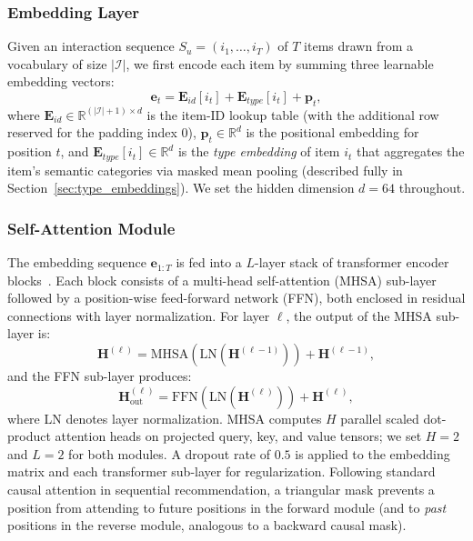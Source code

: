 \subsubsection{Embedding Layer}
Given an interaction sequence $S_u = (i_1, \dots, i_T)$ of $T$ items drawn from a vocabulary of size $|\mathcal{I}|$, we first encode each item by summing three learnable embedding vectors:
\begin{equation}
\mathbf{e}_t = \mathbf{E}_{id}[i_t] + \mathbf{E}_{type}[i_t] + \mathbf{p}_t,
\end{equation}
where $\mathbf{E}_{id} \in \mathbb{R}^{(|\mathcal{I}|+1) \times d}$ is the item-ID lookup table (with the additional row reserved for the padding index $0$), $\mathbf{p}_t \in \mathbb{R}^d$ is the positional embedding for position $t$, and $\mathbf{E}_{type}[i_t] \in \mathbb{R}^d$ is the \emph{type embedding} of item $i_t$ that aggregates the item's semantic categories via masked mean pooling (described fully in Section~\ref{sec:type_embeddings}). We set the hidden dimension $d=64$ throughout.

\subsubsection{Self-Attention Module}
The embedding sequence $\mathbf{e}_{1:T}$ is fed into a $L$-layer stack of transformer encoder blocks~\cite{vaswani2017}. Each block consists of a multi-head self-attention (MHSA) sub-layer followed by a position-wise feed-forward network (FFN), both enclosed in residual connections with layer normalization. For layer $\ell$, the output of the MHSA sub-layer is:
\begin{equation}
\mathbf{H}^{(\ell)} = \text{MHSA}(\text{LN}(\mathbf{H}^{(\ell-1)})) + \mathbf{H}^{(\ell-1)},
\end{equation}
and the FFN sub-layer produces:
\begin{equation}
\mathbf{H}^{(\ell)}_{\text{out}} = \text{FFN}(\text{LN}(\mathbf{H}^{(\ell)})) + \mathbf{H}^{(\ell)},
\end{equation}
where LN denotes layer normalization. MHSA computes $H$ parallel scaled dot-product attention heads on projected query, key, and value tensors; we set $H=2$ and $L=2$ for both modules. A dropout rate of $0.5$ is applied to the embedding matrix and each transformer sub-layer for regularization. Following standard causal attention in sequential recommendation, a triangular mask prevents a position from attending to future positions in the forward module (and to \emph{past} positions in the reverse module, analogous to a backward causal mask).

